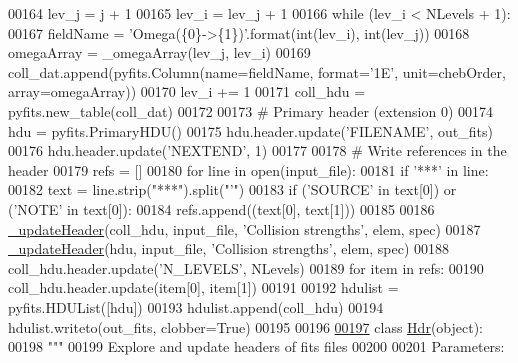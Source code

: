 \begin{DoxyCode}
00164         lev\_j = j + 1
00165         lev\_i = lev\_j + 1
00166         \textcolor{keywordflow}{while} (lev\_i < NLevels + 1):
00167             fieldName = \textcolor{stringliteral}{'Omega(\{0\}->\{1\})'}.format(int(lev\_i), int(lev\_j))
00168             omegaArray = \_omegaArray(lev\_j, lev\_i)
00169             coll\_dat.append(pyfits.Column(name=fieldName, format=\textcolor{stringliteral}{'1E'}, unit=chebOrder, array=omegaArray))
00170             lev\_i += 1
00171     coll\_hdu = pyfits.new\_table(coll\_dat)        
00172             
00173     \textcolor{comment}{# Primary header (extension 0)}
00174     hdu = pyfits.PrimaryHDU()
00175     hdu.header.update(\textcolor{stringliteral}{'FILENAME'}, out\_fits)
00176     hdu.header.update(\textcolor{stringliteral}{'NEXTEND'}, 1)
00177  
00178     \textcolor{comment}{# Write references in the header}
00179     refs = []
00180     \textcolor{keywordflow}{for} line \textcolor{keywordflow}{in} open(input\_file):
00181         \textcolor{keywordflow}{if} \textcolor{stringliteral}{'***'} \textcolor{keywordflow}{in} line:
00182             text = line.strip(\textcolor{stringliteral}{"***"}).split(\textcolor{stringliteral}{"'"})
00183             \textcolor{keywordflow}{if} (\textcolor{stringliteral}{'SOURCE'} \textcolor{keywordflow}{in} text[0]) \textcolor{keywordflow}{or} (\textcolor{stringliteral}{'NOTE'} \textcolor{keywordflow}{in} text[0]):
00184                 refs.append((text[0], text[1]))
00185 
00186     \hyperlink{namespacepyneb_1_1utils_1_1fits_a2c9c6cf69be4278cdfb529f3a8f3dced}{\_updateHeader}(coll\_hdu, input\_file, \textcolor{stringliteral}{'Collision strengths'}, elem, spec)
00187     \hyperlink{namespacepyneb_1_1utils_1_1fits_a2c9c6cf69be4278cdfb529f3a8f3dced}{\_updateHeader}(hdu, input\_file, \textcolor{stringliteral}{'Collision strengths'}, elem, spec)
00188     coll\_hdu.header.update(\textcolor{stringliteral}{'N\_LEVELS'}, NLevels)
00189     \textcolor{keywordflow}{for} item \textcolor{keywordflow}{in} refs:
00190         coll\_hdu.header.update(item[0], item[1])
00191 
00192     hdulist = pyfits.HDUList([hdu])
00193     hdulist.append(coll\_hdu)
00194     hdulist.writeto(out\_fits, clobber=\textcolor{keyword}{True})
00195 
00196 
\hypertarget{fits_8py_source_l00197}{}\hyperlink{classpyneb_1_1utils_1_1fits_1_1_hdr}{00197} \textcolor{keyword}{class }\hyperlink{classpyneb_1_1utils_1_1fits_1_1_hdr}{Hdr}(object):
00198     \textcolor{stringliteral}{"""}
00199 \textcolor{stringliteral}{    Explore and update headers of fits files}
00200 \textcolor{stringliteral}{    }
00201 \textcolor{stringliteral}{    Parameters:}

\end{DoxyCode}
